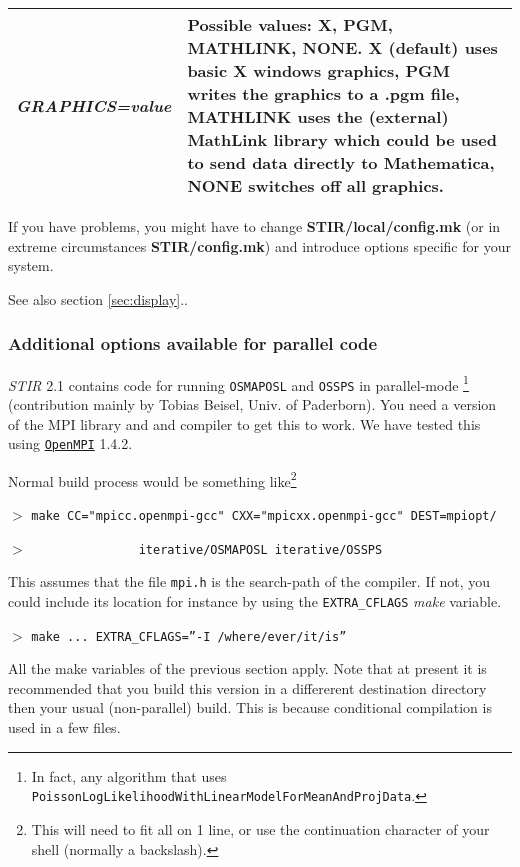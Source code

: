 \documentclass{article}
\def\R2Lurl#1#2{\mbox{\href{#1}{\tt #2}}}
\newcommand{\cmdline}[1]{\par \noindent $>$ \texttt{#1}\par}
\begin{document}
\begin{longtable}{|p{\MakeTableFirstCol}|p{\MakeTableSecondCol}|}
\hline
{\raggedright \textit{GRAPHICS=value}} & 
{\raggedright Possible values: X, PGM, MATHLINK, NONE. X (default) uses basic 
X windows graphics, PGM writes the graphics to a .pgm file, MATHLINK 
uses the (external) MathLink library which could be used to send 
data directly to Mathematica, NONE switches off all graphics.} \\
\hline
\end{longtable}


If you have problems, you might have to change \textbf{STIR/local/config.mk}
(or in extreme circumstances \textbf{STIR/config.mk}) and introduce options 
specific for your system.


See also section \ref{sec:display}..

\subsubsection{
Additional options available for parallel code}

\textit{STIR} 2.1 contains code for running \texttt{OSMAPOSL} and \texttt{OSSPS} in parallel-mode
\footnote{In fact, any algorithm that uses \texttt{PoissonLogLikelihoodWithLinearModelForMeanAndProjData}.}
(contribution mainly by Tobias Beisel, Univ. of Paderborn). You need a version of the MPI library and
and compiler to get this to work. We have tested this using \R2Lurl{http://www.open-mpi.org/}{OpenMPI} 1.4.2.

Normal build process would be something like\footnote{This will need to fit all on
1 line, or use the continuation character of your shell (normally a backslash).}

\cmdline{make  CC="mpicc.openmpi-gcc" CXX="mpicxx.openmpi-gcc" DEST=mpiopt/ }
\cmdline{\,\,\,\,\,\,\,\,\,\,\,\,\,\,\,iterative/OSMAPOSL iterative/OSSPS}

This assumes that the file \texttt{mpi.h} is the search-path of the compiler. If not,
you could include its location for instance by using the \texttt{EXTRA\_CFLAGS} \textit{make} variable.

\cmdline{make ... EXTRA\_CFLAGS=''-I /where/ever/it/is''}

All the make variables of the previous section apply. Note that at present it is 
recommended that you build this version in a differerent destination directory then
your usual (non-parallel) build. This is because conditional compilation is used
in a few files.
\end{document}
